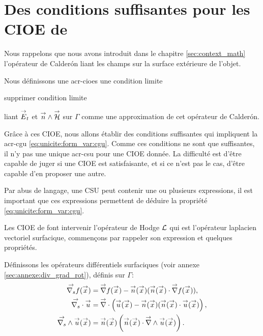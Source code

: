 \section[Des CSU pour les CIOE de Stupfel et Poget 2011]{Des conditions suffisantes pour les CIOE de \cite{stupfel_sufficient_2011}}

  Nous rappelons que nous avons introduit dans le chapitre \ref{sec:context_math} l'opérateur de Calderón liant les champs sur la surface extérieure de l'objet. 


  Nous définissons une \glspl{acr-cioe} une condition limite
  \begin{REM}
  supprimer condition limite
\end{REM} liant \({\overset{\rightarrow}{E}}_t\) et \({\overset{\rightarrow}{n}}\wedge{\overset{\rightarrow}{\mathcal{H}}}\) sur \(\Gamma\) comme une approximation de cet opérateur de Calderón.

  Grâce à ces CIOE, nous allons établir des conditions suffisantes qui impliquent la \gls{acr-cgu} \eqref{eq:unicite:form_var:cgu}.
  Comme ces conditions ne sont que suffisantes, il n'y pas une unique \gls{acr-csu} pour une CIOE donnée.
  La difficulté est d'être capable de juger si une CIOE est satisfaisante, et si ce n'est pas le cas, d'être capable d'en proposer une autre.

  Par abus de langage, une CSU peut contenir une ou plusieurs expressions, il est important que ces expressions permettent de déduire la propriété \eqref{eq:unicite:form_var:cgu}.

  Les CIOE de \cite{stupfel_sufficient_2011} font intervenir l'opérateur de Hodge \(\mathcal{L}\) qui est l'opérateur laplacien vectoriel surfacique, commençons par rappeler son expression et quelques propriétés.

  Définissons les opérateurs différentiels surfaciques (voir annexe \ref{sec:annexe:div_grad_rot}), définis sur \(\Gamma\):
  \begin{align*}
      {\overset{\rightarrow}{\nabla_s}}{f}({\overset{\rightarrow}{x}}) &= {\overset{\rightarrow}{\nabla}}{f}({\overset{\rightarrow}{x}}) - {\overset{\rightarrow}{n}}({\overset{\rightarrow}{x}}) ({\overset{\rightarrow}{n}}({\overset{\rightarrow}{x}}) \cdot {\overset{\rightarrow}{\nabla}}{f}({\overset{\rightarrow}{x}})),
      \\
      {\overset{\rightarrow}{\nabla_s}} \cdot{{\overset{\rightarrow}{u}}} &= {\overset{\rightarrow}{\nabla}}\cdot\left({\overset{\rightarrow}{u}}({\overset{\rightarrow}{x}}) - {\overset{\rightarrow}{n}}({\overset{\rightarrow}{x}}) ({\overset{\rightarrow}{n}}({\overset{\rightarrow}{x}}) \cdot {\overset{\rightarrow}{u}}({\overset{\rightarrow}{x}})\right),
      \\
      {\overset{\rightarrow}{\nabla_s}} \wedge{{\overset{\rightarrow}{u}}}({\overset{\rightarrow}{x}}) &= {\overset{\rightarrow}{n}}({\overset{\rightarrow}{x}})\left({\overset{\rightarrow}{n}}({\overset{\rightarrow}{x}}) \cdot {\overset{\rightarrow}{\nabla}}\wedge{{\overset{\rightarrow}{u}}}({\overset{\rightarrow}{x}})\right).
  \end{align*}


